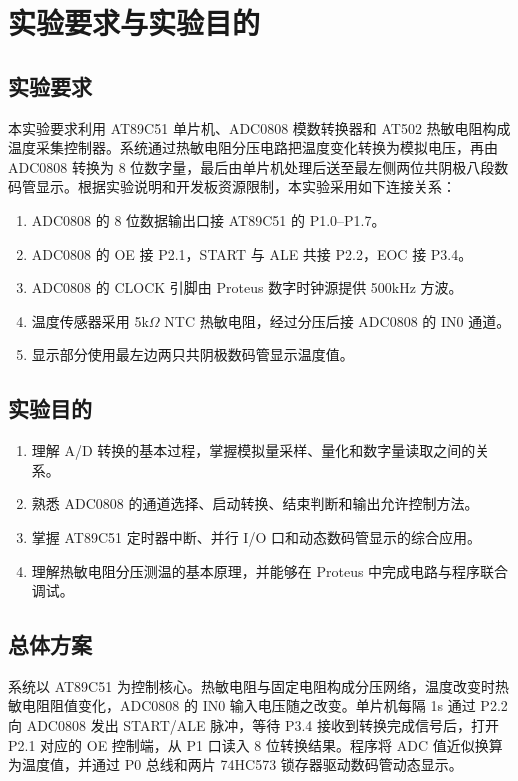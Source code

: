 \section{实验要求与实验目的}

\subsection{实验要求}
本实验要求利用 AT89C51 单片机、ADC0808 模数转换器和 AT502 热敏电阻构成温度采集控制器。系统通过热敏电阻分压电路把温度变化转换为模拟电压，再由 ADC0808 转换为 8 位数字量，最后由单片机处理后送至最左侧两位共阴极八段数码管显示。根据实验说明和开发板资源限制，本实验采用如下连接关系：
\begin{enumerate}
  \item ADC0808 的 8 位数据输出口接 AT89C51 的 P1.0--P1.7。
  \item ADC0808 的 OE 接 P2.1，START 与 ALE 共接 P2.2，EOC 接 P3.4。
  \item ADC0808 的 CLOCK 引脚由 Proteus 数字时钟源提供 500kHz 方波。
  \item 温度传感器采用 5k$\Omega$ NTC 热敏电阻，经过分压后接 ADC0808 的 IN0 通道。
  \item 显示部分使用最左边两只共阴极数码管显示温度值。
\end{enumerate}

\subsection{实验目的}
\begin{enumerate}
  \item 理解 A/D 转换的基本过程，掌握模拟量采样、量化和数字量读取之间的关系。
  \item 熟悉 ADC0808 的通道选择、启动转换、结束判断和输出允许控制方法。
  \item 掌握 AT89C51 定时器中断、并行 I/O 口和动态数码管显示的综合应用。
  \item 理解热敏电阻分压测温的基本原理，并能够在 Proteus 中完成电路与程序联合调试。
\end{enumerate}

\subsection{总体方案}
系统以 AT89C51 为控制核心。热敏电阻与固定电阻构成分压网络，温度改变时热敏电阻阻值变化，ADC0808 的 IN0 输入电压随之改变。单片机每隔 1s 通过 P2.2 向 ADC0808 发出 START/ALE 脉冲，等待 P3.4 接收到转换完成信号后，打开 P2.1 对应的 OE 控制端，从 P1 口读入 8 位转换结果。程序将 ADC 值近似换算为温度值，并通过 P0 总线和两片 74HC573 锁存器驱动数码管动态显示。

